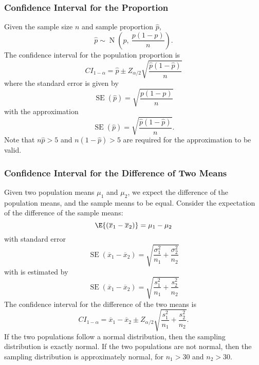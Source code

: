 \documentclass{article}
\begin{document}
\subsubsection{Confidence Interval for the Proportion}
Given the sample size \(n\) and sample proportion \(\hat{p}\),
\begin{equation*}
    \hat{p} \sim \operatorname{N}\left( p,\: \frac{p\left( 1 - p \right)}{n} \right).
\end{equation*}
The confidence interval for the population proportion is
\begin{equation*}{CI}_{1-\alpha} = \hat{p} \pm Z_{\alpha/2} \sqrt{\frac{\hat{p}\left( 1 - \hat{p} \right)}{n}}
\end{equation*}
where the standard error is given by
\begin{equation*}
    \operatorname{SE}\left( \hat{p} \right) = \sqrt{\frac{p\left( 1 - p \right)}{n}}
\end{equation*}
with the approximation
\begin{equation*}
    \operatorname{SE}\left( \hat{p} \right) = \sqrt{\frac{\hat{p}\left( 1 - \hat{p} \right)}{n}}.
\end{equation*}
Note that \(n \hat{p} > 5\) and \(n \left( 1 - \hat{p} \right) > 5\) are
required for the approximation to be valid.
\subsubsection{Confidence Interval for the Difference of Two Means}
Given two population means \(\mu_1\) and \(\mu_2\), we expect the
difference of the population means, and the sample means to be equal.
Consider the expectation of the difference of the sample means:
\begin{equation*}
    \E{\left( \overline{x}_1 - \overline{x}_2 \right)} = \mu_1 - \mu_2
\end{equation*}
with standard error
\begin{equation*}
    \operatorname{SE}\left( \overline{x}_1 - \overline{x}_2 \right) = \sqrt{\frac{\sigma_1^2}{n_1} + \frac{\sigma_2^2}{n_2}}
\end{equation*}
with is estimated by
\begin{equation*}
    \operatorname{SE}\left( \overline{x}_1 - \overline{x}_2 \right) = \sqrt{\frac{s_1^2}{n_1} + \frac{s_2^2}{n_2}}
\end{equation*}
The confidence interval for the difference of the two means is
\begin{equation*}{CI}_{1-\alpha} = \overline{x}_1 - \overline{x}_2 \pm Z_{\alpha/2} \sqrt{\frac{s_1^2}{n_1} + \frac{s_2^2}{n_2}}.
\end{equation*}
If the two populations follow a normal distribution, then the sampling
distribution is exactly normal. If the two populations are not normal,
then the sampling distribution is approximately normal, for \(n_1 > 30\)
and \(n_2 > 30\).
\end{document}
